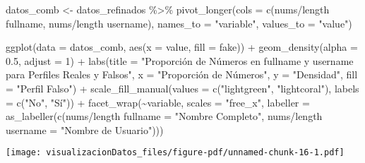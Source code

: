 \documentclass[
  letterpaper,
  DIV=11,
  numbers=noendperiod]{scrreprt}
\newenvironment{Shaded}{\begin{snugshade}}{\end{snugshade}}
\newcommand{\AttributeTok}[1]{\textcolor[rgb]{0.40,0.45,0.13}{#1}}
\newcommand{\DecValTok}[1]{\textcolor[rgb]{0.68,0.00,0.00}{#1}}
\newcommand{\FloatTok}[1]{\textcolor[rgb]{0.68,0.00,0.00}{#1}}
\newcommand{\FunctionTok}[1]{\textcolor[rgb]{0.28,0.35,0.67}{#1}}
\newcommand{\NormalTok}[1]{\textcolor[rgb]{0.00,0.23,0.31}{#1}}
\newcommand{\OtherTok}[1]{\textcolor[rgb]{0.00,0.23,0.31}{#1}}
\newcommand{\SpecialCharTok}[1]{\textcolor[rgb]{0.37,0.37,0.37}{#1}}
\newcommand{\StringTok}[1]{\textcolor[rgb]{0.13,0.47,0.30}{#1}}
\begin{document}
\begin{Shaded}
\begin{Highlighting}[]
\NormalTok{datos\_comb  }\OtherTok{\textless{}{-}}\NormalTok{  datos\_refinados }\SpecialCharTok{\%\textgreater{}\%} 
  \FunctionTok{pivot\_longer}\NormalTok{(}\AttributeTok{cols =} \FunctionTok{c}\NormalTok{(}\StringTok{\textasciigrave{}}\AttributeTok{nums/length fullname}\StringTok{\textasciigrave{}}\NormalTok{, }\StringTok{\textasciigrave{}}\AttributeTok{nums/length username}\StringTok{\textasciigrave{}}\NormalTok{), }
               \AttributeTok{names\_to =} \StringTok{"variable"}\NormalTok{, }
               \AttributeTok{values\_to =} \StringTok{"value"}\NormalTok{)}

\FunctionTok{ggplot}\NormalTok{(}\AttributeTok{data =}\NormalTok{ datos\_comb, }\FunctionTok{aes}\NormalTok{(}\AttributeTok{x =}\NormalTok{ value, }\AttributeTok{fill =}\NormalTok{ fake)) }\SpecialCharTok{+}
  \FunctionTok{geom\_density}\NormalTok{(}\AttributeTok{alpha =} \FloatTok{0.5}\NormalTok{, }\AttributeTok{adjust =} \DecValTok{1}\NormalTok{) }\SpecialCharTok{+}
  \FunctionTok{labs}\NormalTok{(}\AttributeTok{title =} \StringTok{"Proporción de Números en fullname y username para Perfiles Reales y Falsos"}\NormalTok{,}
       \AttributeTok{x =} \StringTok{"Proporción de Números"}\NormalTok{,}
       \AttributeTok{y =} \StringTok{"Densidad"}\NormalTok{,}
       \AttributeTok{fill =} \StringTok{"Perfil Falso"}\NormalTok{) }\SpecialCharTok{+}
  \FunctionTok{scale\_fill\_manual}\NormalTok{(}\AttributeTok{values =} \FunctionTok{c}\NormalTok{(}\StringTok{"lightgreen"}\NormalTok{, }\StringTok{"lightcoral"}\NormalTok{), }\AttributeTok{labels =} \FunctionTok{c}\NormalTok{(}\StringTok{"No"}\NormalTok{, }\StringTok{"Sí"}\NormalTok{)) }\SpecialCharTok{+}  \FunctionTok{facet\_wrap}\NormalTok{(}\SpecialCharTok{\textasciitilde{}}\NormalTok{variable, }\AttributeTok{scales =} \StringTok{"free\_x"}\NormalTok{, }\AttributeTok{labeller =} \FunctionTok{as\_labeller}\NormalTok{(}\FunctionTok{c}\NormalTok{(}\StringTok{\textasciigrave{}}\AttributeTok{nums/length fullname}\StringTok{\textasciigrave{}} \OtherTok{=} \StringTok{"Nombre Completo"}\NormalTok{, }\StringTok{\textasciigrave{}}\AttributeTok{nums/length username}\StringTok{\textasciigrave{}} \OtherTok{=} \StringTok{"Nombre de Usuario"}\NormalTok{)))}
\end{Highlighting}
\end{Shaded}

\texttt{[image: visualizacionDatos\_files/figure-pdf/unnamed-chunk-16-1.pdf]}
\end{document}
